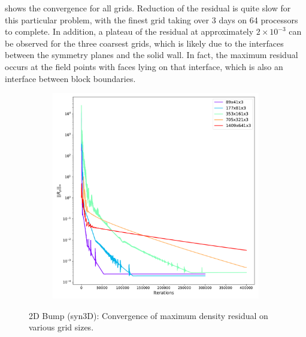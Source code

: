  shows the convergence for all grids. Reduction of the residual is quite slow for this particular problem, with the finest grid taking over 3 days on 64 processors to complete. In addition, a plateau of the residual at approximately $2\times10^{-3}$ can be observed for the three coarsest grids, which is likely due to the interfaces between the symmetry planes and the solid wall. In fact, the maximum residual occurs at the field points with faces lying on that interface, which is also an interface between block boundaries.
\begin{figure}[ht!]
\centering
\begin{subfigure}{.7\textwidth}
  \centering
  \includegraphics[width=1.0\textwidth]{figs/2dbump/convergenceRho.pdf}
\end{subfigure}%
\caption{2D Bump (syn3D): Convergence of maximum density residual on various grid sizes.}
\label{fig:syn2dbumpcnvstudy}
\end{figure}

